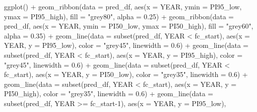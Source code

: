 \documentclass[
  letterpaper,
  DIV=11,
  numbers=noendperiod]{scrreprt}
\newenvironment{Shaded}{\begin{snugshade}}{\end{snugshade}}
\newcommand{\AttributeTok}[1]{\textcolor[rgb]{0.40,0.45,0.13}{#1}}
\newcommand{\DecValTok}[1]{\textcolor[rgb]{0.68,0.00,0.00}{#1}}
\newcommand{\FloatTok}[1]{\textcolor[rgb]{0.68,0.00,0.00}{#1}}
\newcommand{\FunctionTok}[1]{\textcolor[rgb]{0.28,0.35,0.67}{#1}}
\newcommand{\NormalTok}[1]{\textcolor[rgb]{0.00,0.23,0.31}{#1}}
\newcommand{\SpecialCharTok}[1]{\textcolor[rgb]{0.37,0.37,0.37}{#1}}
\newcommand{\StringTok}[1]{\textcolor[rgb]{0.13,0.47,0.30}{#1}}
\begin{document}
\begin{Shaded}
\begin{Highlighting}[]
\FunctionTok{ggplot}\NormalTok{() }\SpecialCharTok{+}
  \FunctionTok{geom\_ribbon}\NormalTok{(}\AttributeTok{data =}\NormalTok{ pred\_df, }\FunctionTok{aes}\NormalTok{(}\AttributeTok{x =}\NormalTok{ YEAR, }\AttributeTok{ymin =}\NormalTok{ PI95\_low, }\AttributeTok{ymax =}\NormalTok{ PI95\_high),}
              \AttributeTok{fill =} \StringTok{"grey80"}\NormalTok{, }\AttributeTok{alpha =} \FloatTok{0.25}\NormalTok{) }\SpecialCharTok{+}
  \FunctionTok{geom\_ribbon}\NormalTok{(}\AttributeTok{data =}\NormalTok{ pred\_df, }\FunctionTok{aes}\NormalTok{(}\AttributeTok{x =}\NormalTok{ YEAR, }\AttributeTok{ymin =}\NormalTok{ PI50\_low, }\AttributeTok{ymax =}\NormalTok{ PI50\_high),}
              \AttributeTok{fill =} \StringTok{"grey60"}\NormalTok{, }\AttributeTok{alpha =} \FloatTok{0.35}\NormalTok{) }\SpecialCharTok{+}
  \FunctionTok{geom\_line}\NormalTok{(}\AttributeTok{data =} \FunctionTok{subset}\NormalTok{(pred\_df, YEAR }\SpecialCharTok{\textless{}}\NormalTok{ fc\_start), }\FunctionTok{aes}\NormalTok{(}\AttributeTok{x =}\NormalTok{ YEAR, }\AttributeTok{y =}\NormalTok{ PI95\_low),}
            \AttributeTok{color =} \StringTok{"grey45"}\NormalTok{, }\AttributeTok{linewidth =} \FloatTok{0.6}\NormalTok{) }\SpecialCharTok{+}
  \FunctionTok{geom\_line}\NormalTok{(}\AttributeTok{data =} \FunctionTok{subset}\NormalTok{(pred\_df, YEAR }\SpecialCharTok{\textless{}}\NormalTok{ fc\_start), }\FunctionTok{aes}\NormalTok{(}\AttributeTok{x =}\NormalTok{ YEAR, }\AttributeTok{y =}\NormalTok{ PI95\_high),}
            \AttributeTok{color =} \StringTok{"grey45"}\NormalTok{, }\AttributeTok{linewidth =} \FloatTok{0.6}\NormalTok{) }\SpecialCharTok{+}
  \FunctionTok{geom\_line}\NormalTok{(}\AttributeTok{data =} \FunctionTok{subset}\NormalTok{(pred\_df, YEAR }\SpecialCharTok{\textless{}}\NormalTok{ fc\_start), }\FunctionTok{aes}\NormalTok{(}\AttributeTok{x =}\NormalTok{ YEAR, }\AttributeTok{y =}\NormalTok{ PI50\_low),}
            \AttributeTok{color =} \StringTok{"grey35"}\NormalTok{, }\AttributeTok{linewidth =} \FloatTok{0.6}\NormalTok{) }\SpecialCharTok{+}
  \FunctionTok{geom\_line}\NormalTok{(}\AttributeTok{data =} \FunctionTok{subset}\NormalTok{(pred\_df, YEAR }\SpecialCharTok{\textless{}}\NormalTok{ fc\_start), }\FunctionTok{aes}\NormalTok{(}\AttributeTok{x =}\NormalTok{ YEAR, }\AttributeTok{y =}\NormalTok{ PI50\_high),}
            \AttributeTok{color =} \StringTok{"grey35"}\NormalTok{, }\AttributeTok{linewidth =} \FloatTok{0.6}\NormalTok{) }\SpecialCharTok{+}
  \FunctionTok{geom\_line}\NormalTok{(}\AttributeTok{data =} \FunctionTok{subset}\NormalTok{(pred\_df, YEAR }\SpecialCharTok{\textgreater{}=}\NormalTok{ fc\_start}\DecValTok{{-}1}\NormalTok{), }\FunctionTok{aes}\NormalTok{(}\AttributeTok{x =}\NormalTok{ YEAR, }\AttributeTok{y =}\NormalTok{ PI95\_low),}

\end{Highlighting}
\end{Shaded}
\end{document}
